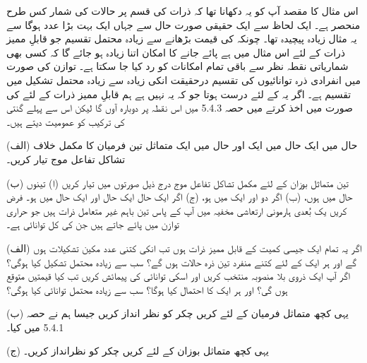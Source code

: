 اس مثال کا مقصد آپ کو یہ دکھانا تھا کہ ذرات کی قسم پر حالات کی شمار کس طرح منحصر ہے۔ ایک لحاظ سے ایک حقیقی صورت حال سے جہاں  ایک بہت بڑا عدد ہوگا سے یہ مثال زیادہ پیچیدہ تھا۔ چونکہ  کی قیمت بڑھانے سے زیادہ محتمل تقسیم جو قابلِ ممیز ذرات کے لئے اس مثال میں  ہے پائے جانے کا امکان اتنا زیادہ ہو جائے گا کہ کسی بھی شماریاتی نقطہ نظر سے باقی تمام امکانات کو رد کیا جا سکتا ہے۔ توازن کی صورت میں انفرادی ذرہ توانائیوں کی تقسیم درحقیقت انکی زیادہ سے زیادہ محتمل تشکیل میں تقسیم ہے۔ اگر یہ   کے لئے درست ہوتا جو کہ یہ نہیں ہے ہم قابلِ ممیز ذرات کے لئے  کی صورت  میں اخذ کرتے  میں حصہ 5.4.3 میں اس نقطہ پر دوبارہ  آوں گا لیکن اس سے پہلے گنتی کی ترکیب کو عمومیت دیتے ہیں۔


(الف) حال  میں ایک حال  میں ایک اور حال  میں ایک متماثل تین فرمیان کا مکمل خلاف تشاکل تفاعل موج  تیار کریں۔

(ب) تین متماثل بوزان کے لئے مکمل تشاکل تفاعل موج درج ذیل صورتوں میں تیار کریں (ا) تینوں حال  میں ہوں، (ب) اگر دو  اور ایک  میں ہو، (ج) اگر ایک حال  ایک حال  اور ایک حال  میں ہو۔ 
فرض کریں یک بُعدی ہارمونی ارتعاشی مخفیہ میں آپ کے پاس تین باہم غیر متعامل ذرات ہیں جو حراری توازن میں پائے جاتے ہیں جن کی کل توانائی ہے۔

(الف) اگر یہ تمام ایک جیسی کمیت کے قابل ممیز ذرات ہوں تب انکی کتنی عدد مکین تشکیلات  ہوں گے اور ہر ایک کے لئے کتنے منفرد تین ذرہ حالات ہوں گے؟ سب سے زیادہ محتمل تشکیل کیا ہوگی؟ اگر آپ ایک ذروی بلا منصوبہ منتخب کریں اور اسکی توانائی کی پیمائش کریں تب کیا قیمتیں متوقع ہوں گی؟ اور ہر ایک کا احتمال کیا ہوگا؟ سب سے زیادہ محتمل توانائی کیا ہوگی؟

(ب) یہی کچھ متماثل فرمیان کے لئے کریں چکر کو نظر انداز کریں جیسا ہم نے حصہ 5.4.1 میں کیا۔

(ج) یہی کچھ متماثل بوزان کے لئے کریں چکر کو نظرانداز کریں۔ 

